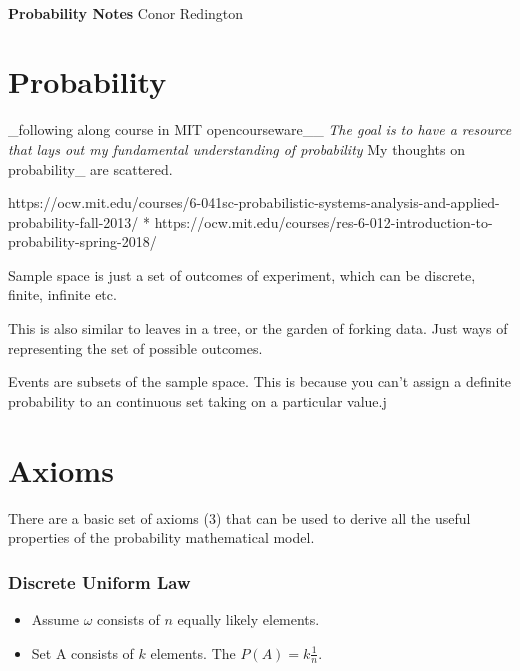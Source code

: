 \documentclass[11pt]{article}
\begin{document}
\thispagestyle{empty}
\bigskip \
\vspace{0.1cm}

\begin{center}
{\fontsize{36}{36} \selectfont \bf \sffamily Probability Notes}
\vskip 24pt
{\fontsize{18}{18} \selectfont \rmfamily Conor Redington} 
\vskip 24pt
\end{center}

\newpage
\microtoc
\newpage

\hypertarget{probability}{%
\section{Probability}\label{probability}}

\_following along course in MIT opencourseware\_\_ \emph{The goal is to
have a resource that lays out my fundamental understanding of
probability} My thoughts on probability\_ are scattered.

https://ocw.mit.edu/courses/6-041sc-probabilistic-systems-analysis-and-applied-probability-fall-2013/
*
https://ocw.mit.edu/courses/res-6-012-introduction-to-probability-spring-2018/

Sample space is just a set of outcomes of experiment, which can be
discrete, finite, infinite etc.

This is also similar to leaves in a tree, or the garden of forking data.
Just ways of representing the set of possible outcomes.

Events are subsets of the sample space. This is because you can't assign
a definite probability to an continuous set taking on a particular
value.j

\hypertarget{axioms}{%
\section{Axioms}\label{axioms}}

There are a basic set of axioms (3) that can be used to derive all the
useful properties of the probability mathematical model.

\hypertarget{discrete-uniform-law}{%
\subsubsection{Discrete Uniform Law}\label{discrete-uniform-law}}

\begin{itemize}
\tightlist
\item
  Assume \(\omega\) consists of \(n\) equally likely elements.
\item
  Set A consists of \(k\) elements. The \(P(A) = k\frac{1}{n}\).
\end{itemize}
\end{document}
